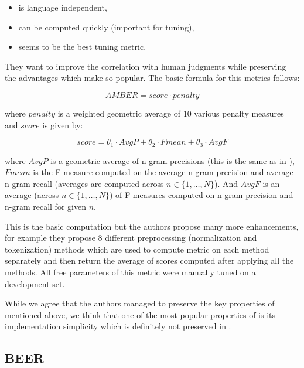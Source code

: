 \begin{itemize}
    \item is language independent,
    \item can be computed quickly (important for tuning),
    \item seems to be the best tuning metric.
\end{itemize}

\noindent They want to improve the correlation with human judgments while
preserving the advantages which make  so popular.
The basic formula for this metrics follows:

\begin{equation*}
    AMBER = score \cdot penalty
\end{equation*}

\noindent where $penalty$ is a weighted geometric average of 10 various penalty
measures and $score$ is given by:

\begin{equation*}
    score  = \theta_1 \cdot AvgP
           + \theta_2 \cdot Fmean 
           + \theta_3 \cdot AvgF 
\end{equation*}

\noindent where $AvgP$ is a geometric average of n-gram precisions (this is the
same as in ), $Fmean$ is the F-measure computed on the average
n-gram precision and average n-gram recall (averages are computed across $n \in
\{1, \ldots, N\}$). And $AvgF$ is an average (across $n \in \{1, \ldots, N\}$)
of F-measures computed on n-gram precision and n-gram recall for given $n$.

This is the basic computation but the authors propose many more enhancements,
for example they propose 8 different preprocessing (normalization and
tokenization) methods which are used to compute  metric on each
method separately and then return the average of scores computed after applying
all the methods. All free parameters of this metric were manually tuned on a
development set.

While we agree that the authors managed to preserve the key properties of
 mentioned above, we think that one of the most popular properties
of  is its implementation simplicity which is definitely not
preserved in . 

\subsection{BEER}

